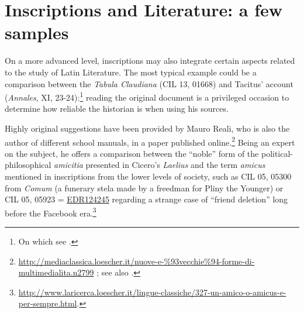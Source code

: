 \documentclass[amsthm,ebook]{saparticle}
\begin{document}
\section{Inscriptions and Literature: a few samples}
\noindent On a more advanced level, inscriptions may also integrate certain aspects related to the study of Latin Literature. The
most typical example could be a comparison between the \emph{Tabula Claudiana} (CIL 13, 01668) and Tacitus’ account (\emph{Annales},
XI, 23-24):\footnote{On which see \citet{Jahn1993}.} reading the original document is a privileged occasion to determine how
reliable the historian is when using his sources.

Highly original suggestions have been provided by Mauro Reali, who is also the author of different school manuals, in a
paper published online.\footnote{\url{http://mediaclassica.loescher.it/nuove-e-\%93vecchie\%94-forme-di-multimedialita.n2799}
; see also \citet{Reali2015}.} Being an expert on the subject, he offers a comparison between the ``noble'' form of
the political-philosophical \emph{amicitia} presented in Cicero’s \emph{Laelius} and the term \emph{amicus} mentioned in inscriptions
from the lower levels of society, such as CIL 05, 05300 from \emph{Comum} (a funerary stela made by a freedman for
Pliny the Younger) or CIL 05, 05923 = \href{http://www.edr-edr.it/edr\_programmi/res\_complex\_comune.php?do=book\&id\_nr=EDR124245}{EDR124245} regarding a strange case of ``friend deletion'' long before the Facebook
era.\footnote{ \url{http://www.laricerca.loescher.it/lingue-classiche/327-un-amico-o-amicus-e-per-sempre.html}.}
\end{document}
